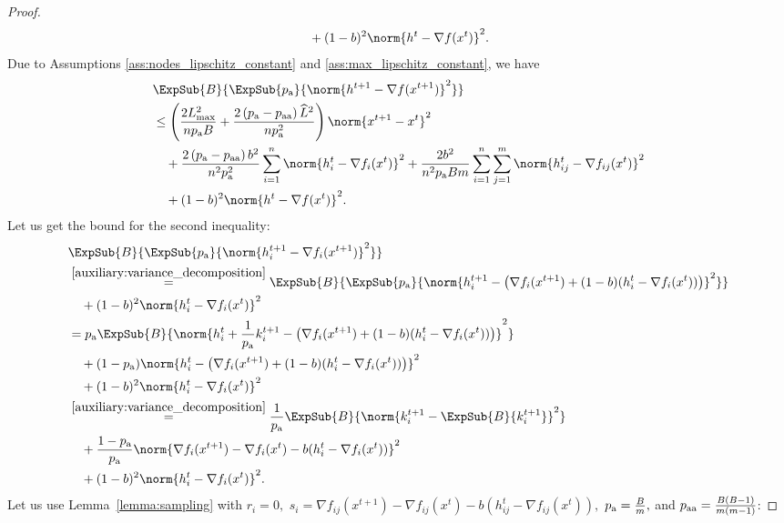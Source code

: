 \documentclass{article}
\newcommand*{\probavailable}{\ensuremath{p_{\textnormal{a}}}}
\newcommand*{\probpairaa}{\ensuremath{p_{\textnormal{aa}}}}
\begin{document}
\begin{proof}
\begin{align*}
    &\quad + (1 - b)^2\norm{h^{t} - \nabla f(x^{t})}^2.
  \end{align*}
  Due to Assumptions \ref{ass:nodes_lipschitz_constant} and \ref{ass:max_lipschitz_constant}, we have
  \begin{align*}
    &\ExpSub{B}{\ExpSub{\probavailable}{\norm{h^{t+1} - \nabla f(x^{t+1})}^2}} \\
    &\leq \left(\frac{2 L_{\max}^2}{n \probavailable B} + \frac{2 \left(\probavailable - \probpairaa\right) \widehat{L}^2}{n \probavailable^2}\right)\norm{x^{t+1} - x^{t}}^2  \\
    &\quad + \frac{2\left(\probavailable - \probpairaa\right)b^2}{n^2 \probavailable^2}\sum_{i=1}^n\norm{h^t_{i} - \nabla f_{i}(x^{t})}^2 + \frac{2b^2}{n^2 \probavailable B m}\sum_{i=1}^n\sum_{j=1}^m\norm{h^t_{ij} - \nabla f_{ij}(x^{t})}^2 \\
    &\quad + (1 - b)^2\norm{h^{t} - \nabla f(x^{t})}^2.
  \end{align*}
  Let us get the bound for the second inequality:
  \begin{align*}
    &\ExpSub{B}{\ExpSub{\probavailable}{\norm{h^{t+1}_i - \nabla f_i(x^{t+1})}^2}} \\
    &\overset{\eqref{auxiliary:variance_decomposition}}{=}\ExpSub{B}{\ExpSub{\probavailable}{ \norm{h^{t+1}_i - \left(\nabla f_i(x^{t+1}) + (1 - b)(h^t_i - \nabla f_i(x^{t}))\right)}^2}} \\
    &\quad +(1 - b)^2\norm{h^{t}_i - \nabla f_i(x^{t})}^2 \\
    &=\probavailable\ExpSub{B}{\norm{h^{t}_i + \frac{1}{\probavailable}k^{t+1}_i - \left(\nabla f_i(x^{t+1}) + (1 - b)(h^t_i - \nabla f_i(x^{t}))\right)}^2} \\
    &\quad +(1 - \probavailable)\norm{h^{t}_i - \left(\nabla f_i(x^{t+1}) + (1 - b)(h^t_i - \nabla f_i(x^{t}))\right)}^2 \\
    &\quad +(1 - b)^2\norm{h^{t}_i - \nabla f_i(x^{t})}^2 \\
    &\overset{\eqref{auxiliary:variance_decomposition}}{=}\frac{1}{\probavailable} \ExpSub{B}{\norm{k^{t+1}_i - \ExpSub{B}{k^{t+1}_i}}^2} \\
    &\quad +\frac{1 - \probavailable}{\probavailable} \norm{\nabla f_i(x^{t+1}) - \nabla f_i(x^{t}) - b(h^t_i - \nabla f_i(x^{t}))}^2 \\
    &\quad +(1 - b)^2\norm{h^{t}_i - \nabla f_i(x^{t})}^2.
  \end{align*}
  Let us use Lemma~\ref{lemma:sampling} with $r_i = 0,$ $s_i = \nabla f_{ij}(x^{t+1}) - \nabla f_{ij}(x^{t}) - b \left(h^t_{ij} - \nabla f_{ij}(x^{t})\right), $ $\probavailable = \frac{B}{m},$ and $\probpairaa = \frac{B(B-1)}{m(m-1)}$:

\end{proof}
\end{document}
